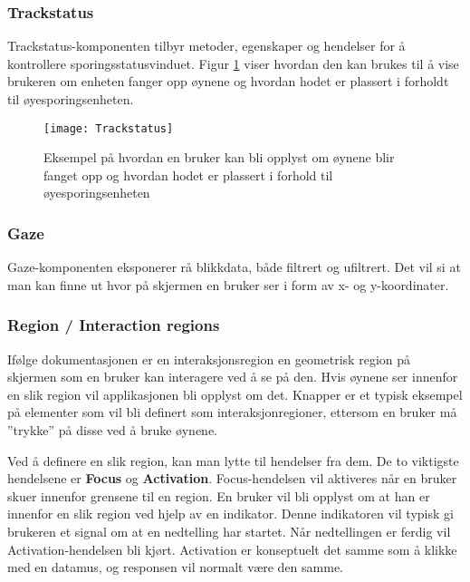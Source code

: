 \subsubsection{Trackstatus}
Trackstatus-komponenten tilbyr metoder, egenskaper og hendelser for å kontrollere sporingsstatusvinduet. Figur \ref{fig:track} viser hvordan den kan brukes til å vise brukeren om enheten fanger opp øynene og hvordan hodet er plassert i forholdt til øyesporingsenheten.

\begin{figure}[ht!]
\centering
\texttt{[image: Trackstatus]}
\caption{Eksempel på hvordan en bruker kan bli opplyst om øynene blir fanget opp og hvordan hodet er plassert i forhold til øyesporingsenheten}
\label{fig:track}
\end{figure}

\subsubsection{Gaze}
Gaze-komponenten eksponerer rå blikkdata, både filtrert og ufiltrert. Det vil si at man kan finne ut hvor på skjermen en bruker ser i form av x- og y-koordinater.  


\subsubsection{Region / Interaction regions}

Ifølge dokumentasjonen er en interaksjonsregion en geometrisk region på skjermen som en bruker kan interagere ved å se på den. Hvis øynene ser innenfor en slik region vil applikasjonen bli opplyst om det. Knapper er et typisk eksempel på elementer som vil bli definert som interaksjonregioner, ettersom en bruker må ”trykke” på disse ved å bruke øynene. 

Ved å definere en slik region, kan man lytte til hendelser fra dem. De to viktigste hendelsene er \textbf{Focus} og \textbf{Activation}. Focus-hendelsen vil aktiveres når en bruker skuer innenfor grensene til en region. En bruker vil bli opplyst om at han er innenfor en slik region ved hjelp av en indikator. Denne indikatoren vil typisk gi brukeren et signal om at en nedtelling har startet. Når nedtellingen er ferdig vil Activation-hendelsen bli kjørt. Activation er konseptuelt det samme som å klikke med en datamus, og responsen vil normalt være den samme.  




